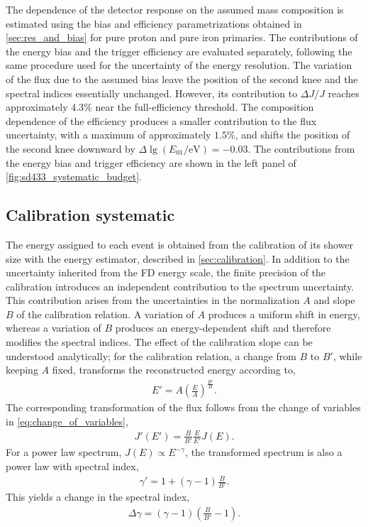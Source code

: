 \documentclass[main.tex]{subfiles}
\begin{document}
The dependence of the detector response on the assumed mass composition is estimated using the bias and efficiency parametrizations obtained in \cref{sec:res_and_bias} for pure proton and pure iron primaries.
The contributions of the energy bias and the trigger efficiency are evaluated separately, following the same procedure used for the uncertainty of the energy resolution.
%
The variation of the flux due to the assumed bias leave the position of the second knee and the spectral indices essentially unchanged.
However, its contribution to $\Delta J/J$ reaches approximately $4.3\%$ near the full-efficiency threshold.
The composition dependence of the efficiency produces a smaller contribution to the flux uncertainty, with a maximum of approximately $1.5\%$, and shifts the position of the second knee downward by
$\Delta\lg(E_{01}/\mathrm{eV})=-0.03$.
%
The contributions from the energy bias and trigger efficiency are shown in the left panel of \cref{fig:sd433_systematic_budget}.

\subsection{Calibration systematic}
\label{subsec:calibration_systematic}

The energy assigned to each  event is obtained from the calibration of its shower size with the  energy estimator, described in \cref{sec:calibration}.
In addition to the uncertainty inherited from the FD energy scale, the finite precision of the calibration introduces an independent contribution to the spectrum uncertainty.
This contribution arises from the uncertainties in the normalization $A$ and slope $B$ of the calibration relation.
A variation of $A$ produces a uniform shift in energy, whereas a variation of $B$ produces an energy-dependent shift and therefore modifies the spectral indices.
%
The effect of the calibration slope can be understood analytically; for the calibration relation, a change from $B$ to $B'$, while keeping $A$ fixed, transforms the reconstructed energy according to,
\begin{align}
    E'
    =
    A
    \left(\frac{E}{A}\right)^{\frac{B'}{B}}.
    \label{eq:calibration_energy_transformation}
\end{align}
The corresponding transformation of the flux follows from the change of variables in \cref{eq:change_of_variables},
\begin{align}
    J'(E')
    =
    \frac{B}{B'}
    \frac{E}{E'}
    J(E).
    \label{eq:calibration_flux_transformation}
\end{align}
For a power law spectrum, $J(E)\propto E^{-\gamma}$, the transformed spectrum is also a power law with spectral index,
\begin{align}
    \gamma'
    =
    1+(\gamma-1)\frac{B}{B'}.
    \label{eq:calibration_spectral_index}
\end{align}
This yields a change in the spectral index,
\begin{align}
    \Delta\gamma
    =
    (\gamma-1)
    \left(\frac{B}{B'}-1\right).
    \label{eq:calibration_spectral_index_change}
\end{align}
\end{document}
